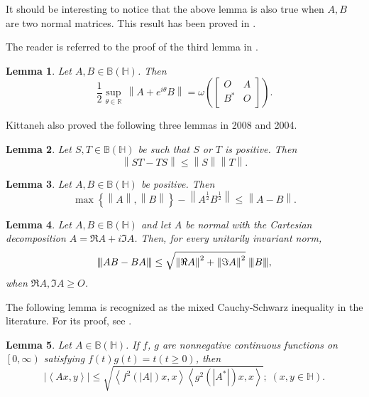 \documentclass[12pt,twoside,reqno]{amsart}
\newcommand{\vertiii}[1]{{\left\vert\kern-0.25ex\left\vert\kern-0.25ex\left\vert #1 
    \right\vert\kern-0.25ex\right\vert\kern-0.25ex\right\vert}}
\newtheorem{lemma}{Lemma}[section]
\numberwithin{equation}{section}
\begin{document}
It should be interesting to notice that the above lemma is also true when $A, B$ are two normal matrices. This result has been proved in \cite[Corollary 3.2]{SGM}.


The reader is referred to the proof of the third lemma in \cite[(4.6)]{HKS}.
\begin{lemma}\label{3}
Let $A,B\in \mathbb B\left( \mathbb H \right)$. Then
\[\frac{1}{2}\underset{\theta \in \mathbb{R}}{\mathop{\sup }}\,\left\| A+{{e}^{i\theta }}B \right\|=\omega \left( \left[ \begin{matrix}
   O & A  \\
   {{B}^{*}} & O  \\
\end{matrix} \right] \right).\]
\end{lemma}

Kittaneh also proved the following three lemmas in 2008 and 2004.
\begin{lemma}\label{14}
\cite[Theorem 1]{K} Let $S,T\in \mathbb B\left( \mathbb H \right)$ be such that $S$ or $T$ is positive. Then
\[\left\| ST-TS \right\|\le \left\| S \right\|\left\| T \right\|.\]
\end{lemma}

\begin{lemma}\label{17}
\cite[Corollary 1]{Kittaneh2004} Let $A,B\in \mathbb B\left( \mathbb H \right)$ be positive. Then
\[\max \left\{ \left\| A \right\|,\left\| B \right\| \right\}-\left\| {{A}^{\frac{1}{2}}}{{B}^{\frac{1}{2}}} \right\|\le \left\| A-B \right\|.\]
\end{lemma}

\begin{lemma}\label{22}
\cite{K2008} Let $A,B\in \mathbb B\left( \mathbb H \right)$ and let $A$ be normal with the Cartesian decomposition $A=\Re A+i\Im A$. Then, for every unitarily invariant norm,
	\[{{\vertiii{ AB-BA }}}\le \sqrt{{{\left\| \Re A \right\|}^{2}}+{{\left\| \Im A \right\|}^{2}}}\;{{\vertiii{ B }}},\]
when $\Re A,\Im A\ge O$. 
\end{lemma}

The following lemma is recognized as the mixed Cauchy-Schwarz inequality in the literature. For its proof, see \cite{Kittaneh1988}.
\begin{lemma}\label{27}
Let $A\in \mathbb B\left( \mathbb H \right)$. If $f$, $g$ are nonnegative continuous functions on $\left[ 0,\infty  \right)$ satisfying $f\left( t \right)g\left( t \right)=t\left( t\ge 0 \right)$, then
\[\left| \left\langle Ax,y \right\rangle  \right|\le \sqrt{\left\langle {{f}^{2}}\left( \left| A \right| \right)x,x \right\rangle \left\langle {{g}^{2}}\left( \left| {{A}^{*}} \right| \right)x,x \right\rangle };\;\left( x,y\in \mathbb H \right).\]
\end{lemma}
\end{document}
